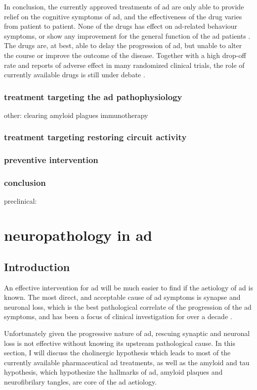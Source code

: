 In conclusion, the currently approved treatments of \gls{ad} are only able to provide relief on the cognitive symptoms of \gls{ad}, and the effectiveness of the drug varies from patient to patient. None of the drugs has effect on \gls{ad}-related behaviour symptoms, or show any improvement for the general function of the \gls{ad} patients \citep{tan14}. The drugs are, at best, able to delay the progression of \gls{ad}, but unable to alter the course or improve the outcome of the disease. Together with a high drop-off rate and reports of adverse effect in many randomized clinical trials, the role of currently available drugs is still under debate \citep{bond12}. 



\subsubsection{treatment targeting the \gls{ad} pathophysiology}
other: clearing amyloid plagues
immunotherapy
\subsubsection{treatment targeting restoring circuit activity}
\subsubsection{preventive intervention}
\subsubsection{conclusion}

preclinical: \citep{malek-ahmadi16} \citep{reiman16}

\section{neuropathology in \gls{ad}}
\subsection{Introduction}
An effective intervention for \gls{ad} will be much easier to find if the aetiology of \gls{ad} is known. The most direct, and acceptable cause of \gls{ad} symptoms is synapse and neuronal loss, which is the best pathological correlate of the progression of the \gls{ad} symptoms, and has been a focus of clinical investigation for over a decade \citep{selkoe02, coleman04}. 

Unfortunately given the progressive nature of \gls{ad}, rescuing synaptic and neuronal loss is not effective without knowing its upstream pathological cause. In this section, I will discuss the cholinergic hypothesis which leads to most of the currently available pharmaceutical \gls{ad} treatments, as well as the amyloid and tau hypothesis, which hypothesize the hallmarks of \gls{ad}, amyloid plaques and neurofibrilary tangles, are core of the \gls{ad} aetiology. 

